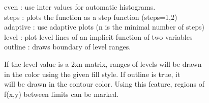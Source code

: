\documentclass[a4paper,10pt]{article}
\begin{document}
\begin{eulernotebook}
\begin{eulercomment}
\begin{eulercomment}
\begin{eulercomment}
\begin{eulercomment}
\begin{eulercomment}
\begin{eulercomment}
\begin{eulercomment}
\begin{eulercomment}
\begin{eulercomment}
even      : use inter values for automatic histograms.\\
steps     : plots the function as a step function (steps=1,2)\\
adaptive  : use adaptive plots (n is the minimal number of steps)\\
level     : plot level lines of an implicit function of two variables\\
outline   : draws boundary of level ranges.

If the level value is a 2xn matrix, ranges of levels will be drawn\\
in the color using the given fill style. If outline is true, it\\
will be drawn in the contour color. Using this feature, regions of\\
f(x,y) between limits can be marked.


\end{eulercomment}
\end{eulercomment}
\end{eulercomment}
\end{eulercomment}
\end{eulercomment}
\end{eulercomment}
\end{eulercomment}
\end{eulercomment}
\end{eulercomment}
\end{eulernotebook}
\end{document}
